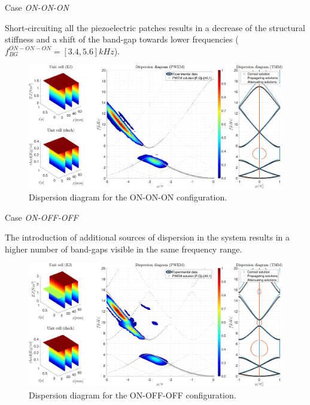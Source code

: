 \begin{frame}{Case \textit{ON-ON-ON}}

    Short-circuiting all the piezoelectric patches results in a decrease of the structural stiffness and a shift of the band-gap towards lower frequencies ($f_{BG}^{ON-ON-ON} = [3.4, 5.6] kHz$).

    \begin{figure}[H]
        \centering
        \includegraphics[width=\textwidth]{./img/MATLAB/PWEM_TMM_EXP ON-ON-ON @0kHz.pdf}
        \caption{Dispersion diagram for the ON-ON-ON configuration.}
    \end{figure}

\end{frame}



\begin{frame}{Case \textit{ON-OFF-OFF}}

    The introduction of additional sources of dispersion in the system results in a higher number of band-gaps visible in the same frequency range.

    \begin{figure}[H]
        \centering
        \includegraphics[width=\textwidth]{./img/MATLAB/PWEM_TMM_EXP ON-OFF-OFF @0kHz.pdf}
        \caption{Dispersion diagram for the ON-OFF-OFF configuration.}
    \end{figure}

\end{frame}



